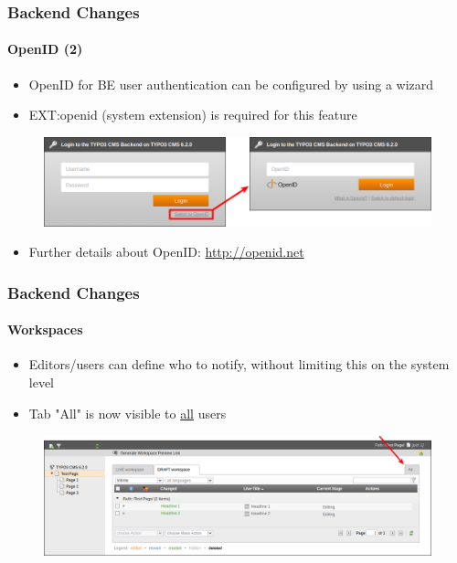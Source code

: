 
\begin{frame}[fragile]
	\frametitle{Backend Changes}
	\framesubtitle{OpenID (2)}

 	\begin{itemize}
		\item OpenID for BE user authentication can be configured by using a wizard
		\item EXT:openid (system extension) is required for this feature
	\end{itemize}

	\begin{figure}
		\includegraphics[width=0.8\linewidth]{Images/BackendChanges/OpenIdLogin.png}
	\end{figure}

 	\begin{itemize}
		\item Further details about OpenID:\newline
			\small\url{http://openid.net}\normalsize
	\end{itemize}

\end{frame}


\begin{frame}[fragile]
	\frametitle{Backend Changes}
	\framesubtitle{Workspaces}

 	\begin{itemize}
		\item Editors/users can define who to notify, without limiting this on the system level
		\item Tab "All" is now visible to \underline{all} users
	\end{itemize}

	\begin{figure}
		\includegraphics[width=0.95\linewidth]{Images/BackendChanges/WorkspacesTabAll.png}
	\end{figure}

\end{frame}


